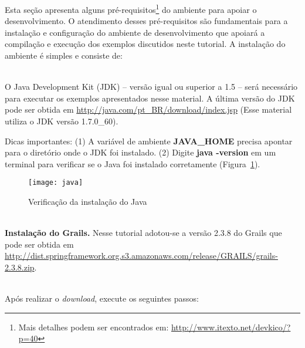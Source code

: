 {\vspace{0.3cm}

Esta  seção   apresenta  alguns  pré-requisitos\footnote{Mais detalhes podem ser
  encontrados  em: \url{http://www.itexto.net/devkico/?p=40}}  do  ambiente para
apoiar o  desenvolvimento. O atendimento desses  pré-requisitos são fundamentais
para a  instalação e configuração do  ambiente de desenvolvimento  que apoiará a
compilação e execução dos exemplos discutidos neste tutorial.  A instalação do 
ambiente é simples e consiste de:

\hspace{1cm}\\
  O Java  Development Kit  (JDK) –
versão  igual ou  superior a  1.5 –  será necessário  para executar  os exemplos
apresentados  nesse  material.   A última  versão  do  JDK  pode ser  obtida  em
{\footnotesize\url{http://java.com/pt_BR/download/index.jsp}}   (Esse   material
utiliza o JDK versão 1.7.0\_60). 

\vspace{0.5cm}

Dicas importantes: (1)  A variável de ambiente {\bf  JAVA\_HOME} precisa apontar
para o diretório onde o JDK foi  instalado. (2) Digite {\bf java -version} em um
terminal    para   verificar    se   o    Java   foi    instalado   corretamente
(Figura~\ref{jdkFig}).

\vspace{0.5cm}

\begin{figure}[htbp]
\centering\texttt{[image: java]}
\caption{Verificação da instalação do Java}
\label{jdkFig}
\end{figure}

\newpage

\hspace{1cm}\\ {\bf  Instalação do Grails.}   Nesse tutorial adotou-se  a versão
2.3.8       do       Grails       que       pode       ser       obtida       em
{\footnotesize\url{http://dist.springframework.org.s3.amazonaws.com/release/GRAILS/grails-2.3.8.zip}}. 
  
\hspace{1cm}\\
\noindent Após realizar o {\it download}, execute os seguintes passos:

\vspace{0.3cm}

\begin{enumerate}


\end{enumerate}}
